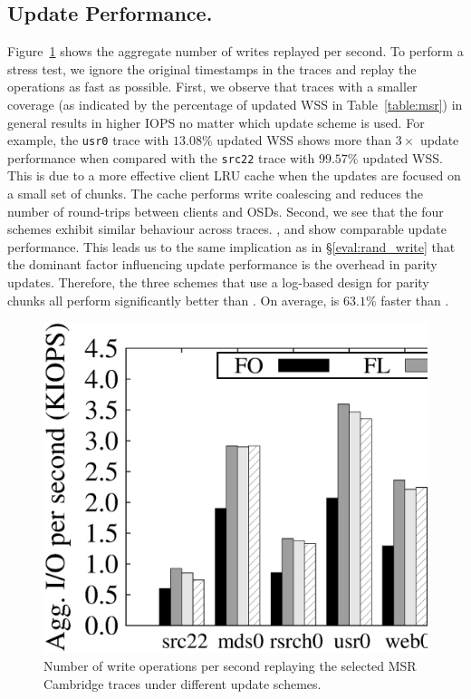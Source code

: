 \subsection{Update Performance.} Figure~\ref{fig:msr_update} shows the aggregate
number of writes replayed per second. To perform a stress test, we ignore the
original timestamps in the traces and replay the operations as fast as possible.
First, we observe that
traces with a smaller coverage (as indicated by the percentage of updated WSS in
Table~\ref{table:msr}) in general results in higher IOPS no matter which update
scheme is used. For example, the \texttt{usr0} trace with $13.08\%$ updated
WSS shows more than ${3\times}$ update performance when compared with the
\texttt{src22} trace with $99.57\%$ updated WSS.  This
is due to a more effective client LRU cache when the updates are focused on a
small set of chunks. The cache performs write coalescing and reduces the number
of round-trips between clients and OSDs. Second, we see that the four schemes
exhibit similar behaviour across traces. \FL, \PL and \PLR show comparable
update performance.  This leads us to the same implication as in
\S\ref{eval:rand_write} that the dominant factor influencing update performance
is the overhead in parity updates. Therefore, the three schemes that use a
log-based design for parity chunks all perform significantly better than \FO. On
average, \PLR is ${63.1}\%$ faster than \FO.

\begin{figure}[t]
    \centering
    \includegraphics[width=\linewidth]{charts/msr_update/eps/msr_update}
    \vspace{-12pt}
    \caption{Number of write operations per second replaying the selected MSR
        Cambridge traces under different update schemes.}
    \label{fig:msr_update}
\end{figure}

